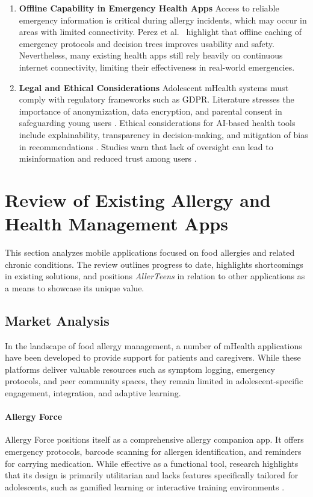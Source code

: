 \documentclass[MScCS]{uccthesis}
\begin{document}
\begin{enumerate}
    \item \textbf{Offline Capability in Emergency Health Apps}  
    Access to reliable emergency information is critical during allergy incidents, which may occur in areas with limited connectivity. Perez et al.~\cite{perez2019mobile} highlight that offline caching of emergency protocols and decision trees improves usability and safety. Nevertheless, many existing health apps still rely heavily on continuous internet connectivity, limiting their effectiveness in real-world emergencies.  

    \item \textbf{Legal and Ethical Considerations}  
    Adolescent mHealth systems must comply with regulatory frameworks such as GDPR. Literature stresses the importance of anonymization, data encryption, and parental consent in safeguarding young users \cite{bajowala2022telehealth}. Ethical considerations for AI-based health tools include explainability, transparency in decision-making, and mitigation of bias in recommendations \cite{macmath2023ai}. Studies warn that lack of oversight can lead to misinformation and reduced trust among users \cite{sullivan2024telehealth}.  
\end{enumerate}



\section{Review of Existing Allergy and Health Management Apps}
This section analyzes mobile applications focused on food allergies and related chronic conditions. The review outlines progress to date, highlights shortcomings in existing solutions, and positions \textit{AllerTeens} in relation to other applications as a means to showcase its unique value.


\subsection{Market Analysis}

In the landscape of food allergy management, a number of mHealth applications have been developed to provide support for patients and caregivers. While these platforms deliver valuable resources such as symptom logging, emergency protocols, and peer community spaces, they remain limited in adolescent-specific engagement, integration, and adaptive learning.  

\paragraph{Allergy Force}  
Allergy Force positions itself as a comprehensive allergy companion app. It offers emergency protocols, barcode scanning for allergen identification, and reminders for carrying medication. While effective as a functional tool, research highlights that its design is primarily utilitarian and lacks features specifically tailored for adolescents, such as gamified learning or interactive training environments \parencite{matricardi2020mhealth}.  
\end{document}
